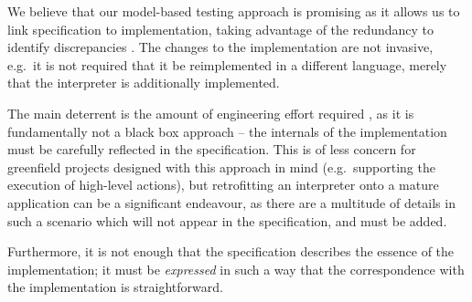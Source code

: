 \documentclass[a4paper]{article}
\begin{document}
We believe that our model-based testing approach is promising as it allows us to link specification to implementation, taking advantage of the redundancy to identify discrepancies \cite{fonseca2017empirical}.
%
The changes to the implementation are not invasive, e.g.~it is not required that it be reimplemented in a different language, merely that the interpreter is additionally implemented.

The main deterrent is the amount of engineering effort required \cite{Davis_2020}, as it is fundamentally not a black box approach -- the internals of the implementation must be carefully reflected in the specification.
%
This is of less concern for greenfield projects designed with this approach in mind (e.g.~supporting the execution of high-level actions), but retrofitting an interpreter onto a mature application can be a significant endeavour, as there are a multitude of details in such a scenario which will not appear in the specification, and must be added.

Furthermore, it is not enough that the specification describes the essence of the implementation; it must be \emph{expressed} in such a way that the correspondence with the implementation is straightforward.

\printbibliography
\end{document}

